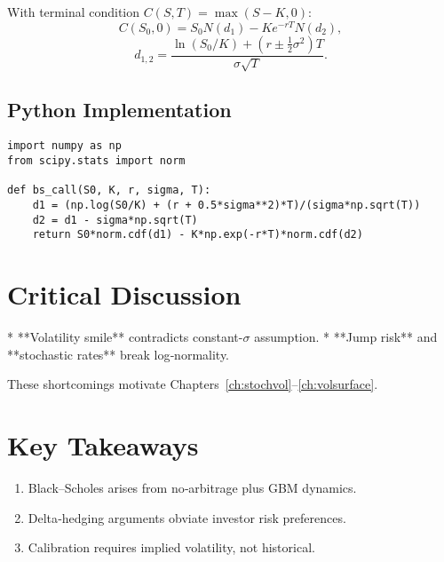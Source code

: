 With terminal condition \(C(S,T)=\max(S-K,0)\):
\[
C(S_0,0) = S_0 N(d_1) - K e^{-rT} N(d_2),
\]
\[
d_{1,2} = \frac{\ln(S_0/K) + (r \pm \tfrac12\sigma^2)T}{\sigma\sqrt{T}}.
\]

\subsection*{Python Implementation}

\begin{verbatim}
import numpy as np
from scipy.stats import norm

def bs_call(S0, K, r, sigma, T):
    d1 = (np.log(S0/K) + (r + 0.5*sigma**2)*T)/(sigma*np.sqrt(T))
    d2 = d1 - sigma*np.sqrt(T)
    return S0*norm.cdf(d1) - K*np.exp(-r*T)*norm.cdf(d2)
\end{verbatim}

\section{Critical Discussion}

* **Volatility smile** contradicts constant-\(\sigma\) assumption.  
* **Jump risk** and **stochastic rates** break log‑normality.  

These shortcomings motivate Chapters~\ref{ch:stochvol}–\ref{ch:volsurface}.

\section*{Key Takeaways}
\begin{enumerate}
  \item Black--Scholes arises from no‑arbitrage plus GBM dynamics.
  \item Delta‑hedging arguments obviate investor risk preferences.
  \item Calibration requires implied volatility, not historical.
\end{enumerate}
